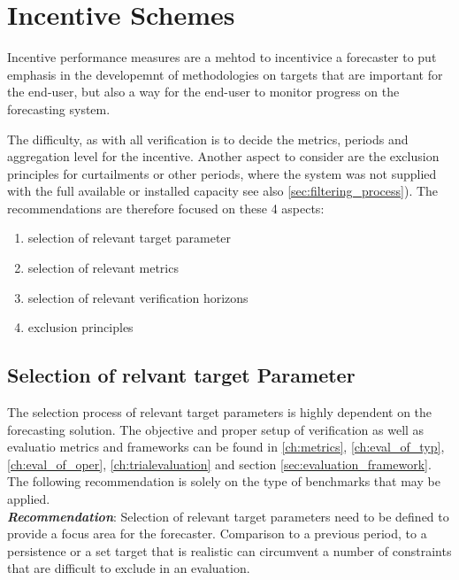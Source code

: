 \chapter{Incentive Schemes}\label{ch:incentives}

Incentive performance measures are a mehtod to incentivice a forecaster to put emphasis in the developemnt of methodologies on targets that are important for the end-user, but also a way for the end-user to monitor progress on the forecasting system. 

The difficulty, as with all verification is to decide the metrics, periods and aggregation level for the incentive. 
Another aspect to consider are the exclusion principles for curtailments or other periods, where the system was not supplied with the full available or installed capacity see also \ref{sec:filtering_process}). 
The recommendations are therefore focused on these 4 aspects:
\begin{enumerate}
    \item selection of relevant target parameter
    \item selection of relevant metrics
    \item selection of relevant verification horizons
    \item exclusion principles
\end{enumerate}


\section{Selection of relvant target Parameter}

The selection process of relevant target parameters is highly dependent on the forecasting solution. The objective and proper setup of verification as well as evaluatio metrics and frameworks can be found in \ref{ch:metrics}, \ref{ch:eval_of_typ}, \ref{ch:eval_of_oper}, \ref{ch:trialevaluation} and section \ref{sec:evaluation_framework}. 
The following recommendation is solely on the type of benchmarks that may be applied. \\

\textbf{\emph{Recommendation}}: Selection of relevant target parameters need to be defined to provide a focus area for the forecaster. Comparison to a previous period, to a persistence or a set target that is realistic can circumvent a number of constraints that are difficult to exclude in an evaluation. 

